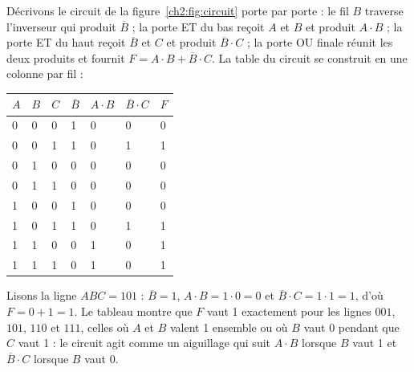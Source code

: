 \begin{exemple}[analyse du circuit $F = A \cdot B + \overline{B} \cdot C$]
Décrivons le circuit de la figure~\ref{ch2:fig:circuit} porte par porte : le fil $B$ traverse l'inverseur qui produit $\overline{B}$ ; la porte ET du bas reçoit $A$ et $B$ et produit $A \cdot B$ ; la porte ET du haut reçoit $\overline{B}$ et $C$ et produit $\overline{B} \cdot C$ ; la porte OU finale réunit les deux produits et fournit $F = A \cdot B + \overline{B} \cdot C$. La table du circuit se construit en une colonne par fil :

\begin{center}
\begin{tabular}{C{0.9cm}C{0.9cm}C{0.9cm}C{1.3cm}C{1.4cm}C{1.6cm}C{1.1cm}}
\toprule
{}$A$ & $B$ & $C$ & $\overline{B}$ & $A \cdot B$ & $\overline{B} \cdot C$ & $F$\\
 & 0 & 0 & 1 & 0 & 0 & 0\\
0 & 0 & 1 & 1 & 0 & 1 & 1\\
0 & 1 & 0 & 0 & 0 & 0 & 0\\
0 & 1 & 1 & 0 & 0 & 0 & 0\\
1 & 0 & 0 & 1 & 0 & 0 & 0\\
1 & 0 & 1 & 1 & 0 & 1 & 1\\
1 & 1 & 0 & 0 & 1 & 0 & 1\\
1 & 1 & 1 & 0 & 1 & 0 & 1\\
\bottomrule
\end{tabular}
\label{ch2:tab:circuit}
\end{center}

Lisons la ligne $ABC = 101$ : $\overline{B} = 1$, $A \cdot B = 1 \cdot 0 = 0$ et $\overline{B} \cdot C = 1 \cdot 1 = 1$, d'où $F = 0 + 1 = 1$. Le tableau montre que $F$ vaut 1 exactement pour les lignes $001$, $101$, $110$ et $111$, celles où $A$ et $B$ valent 1 ensemble ou où $B$ vaut 0 pendant que $C$ vaut 1 : le circuit agit comme un aiguillage qui suit $A \cdot B$ lorsque $B$ vaut 1 et $\overline{B} \cdot C$ lorsque $B$ vaut 0.
\end{exemple}

